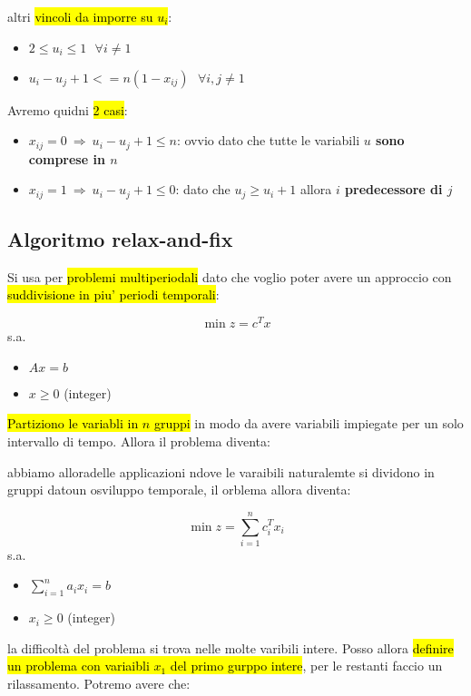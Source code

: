 altri \hl{vincoli da imporre su $u_i$}:

\begin{itemize}
    \item $2 \leq u_i \leq 1\ \ \ \forall i \neq 1$
    \item $u_i - u_j + 1 <= n(1-x_{ij})\ \ \ \forall i,j \neq 1$
\end{itemize}

Avremo quidni \hl{2 casi}:

\begin{itemize}
    \item $x_{ij} = 0\ \Rightarrow\ u_i - u_j +1 \leq n$: ovvio dato che tutte le variabili \textbf{$u$ sono comprese in $n$}
    \item $x_{ij} = 1\ \Rightarrow\ u_i - u_j + 1 \leq 0$: dato che $u_j \geq u_i + 1$ allora \textbf{$i$ predecessore di $j$}
\end{itemize}


\subsection{Algoritmo relax-and-fix}

Si usa per \hl{problemi multiperiodali} dato che voglio poter avere un approccio con \hl{suddivisione in piu' periodi temporali}:

$$\min z = c^Tx$$
s.a.
\begin{itemize}
    \item $Ax=b$
    \item $x \geq 0$ (integer)
\end{itemize}

\hl{Partiziono le variabli in $n$ gruppi} in modo da avere variabili impiegate per un solo intervallo di tempo. Allora il problema diventa:

abbiamo alloradelle applicazioni ndove le varaibili naturalemte si dividono in gruppi datoun osviluppo temporale, il orblema allora diventa:

$$\min z = \sum_{i=1}^n c_i^Tx_i$$
s.a.
\begin{itemize}
    \item $\sum_{i=1}^na_ix_i=b$
    \item $x_i \geq 0$ (integer)
\end{itemize}

la difficoltà del problema si trova nelle molte varibili intere. Posso allora \hl{definire un problema con variaibli $x_1$ del primo gurppo intere}, per le restanti faccio un rilassamento. Potremo avere che:


